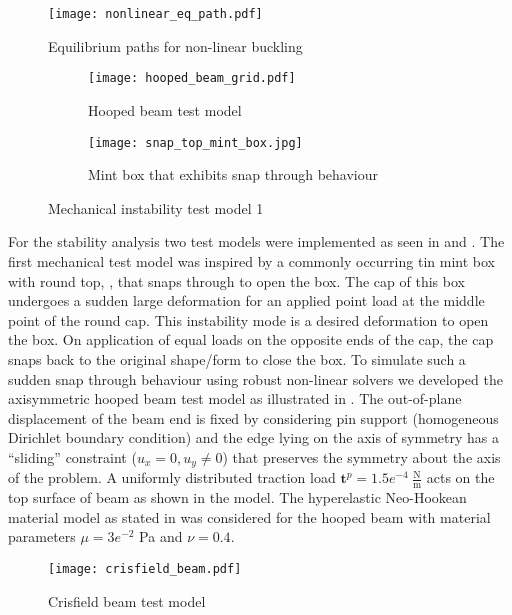 \begin{figure}[h]
\centering 
\texttt{[image: nonlinear\_eq\_path.pdf]}
\caption{Equilibrium paths for non-linear buckling}
\label{fig:2.8}
\end{figure}

\begin{figure}[ht!]
\centering
\begin{subfigure}[b]{0.7\textwidth}
\centering
\texttt{[image: hooped\_beam\_grid.pdf]}
\caption{Hooped beam test model}
\label{fig:2.6.1}
\end{subfigure}
\begin{subfigure}[b]{0.29\textwidth}
\centering
\texttt{[image: snap\_top\_mint\_box.jpg]}
\caption{Mint box that exhibits snap through behaviour}
\label{fig:2.6.2}
\end{subfigure}
\caption{Mechanical instability test model 1}
\label{fig:2.6}
\end{figure}

For the stability analysis two test models were implemented as seen in  and . The first mechanical test model was inspired by a commonly occurring tin mint box with round top, , that snaps through to open the box. The cap of this box undergoes a sudden large deformation for an applied point load at the middle point of the round cap. This instability mode is a desired deformation to open the box. On application of equal loads on the opposite ends of the cap, the cap snaps back to the original shape/form to close the box. To simulate such a sudden snap through behaviour using robust non-linear solvers we developed the axisymmetric hooped beam test model as illustrated in . The out-of-plane displacement of the beam end is fixed by considering pin support (homogeneous Dirichlet boundary condition) and the edge lying on the axis of symmetry has a ``sliding'' constraint ($u_x = 0, u_y \neq 0$) that preserves the symmetry about the axis of the problem. A uniformly distributed traction load $\mathbf{t}^p = 1.5e^{-4} \ \frac{\text{N}}{\text{m}}$ acts on the top surface of beam as shown in the model. The hyperelastic Neo-Hookean material model as stated in  was considered for the hooped beam with material parameters $\mu = 3e^{-2}$ Pa and $\nu = 0.4$.\par 

\begin{figure}[ht!]
\centering
\texttt{[image: crisfield\_beam.pdf]}
\caption{Crisfield beam test model}
\label{fig:2.14}
\end{figure}

